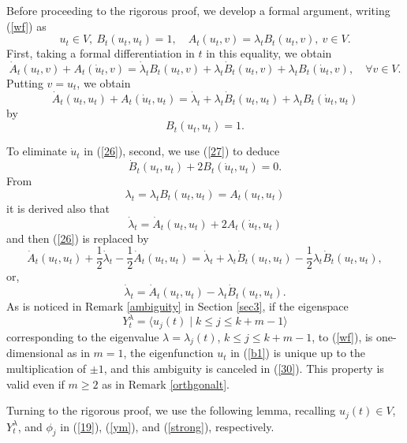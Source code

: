 \documentclass[final,a4paper]{jmsj}
\theoremstyle{thmstyleone}%
\theoremstyle{thmstyletwo}%
\theoremstyle{thmstylethree}%
\begin{document}
Before proceeding to the rigorous proof, we develop a formal argument, writing (\ref{wf}) as 
\begin{equation} 
u_t\in V, \ B_t(u_t,u_t)=1, \quad A_t(u_t,v)=\lambda_tB_t(u_t,v), \ v\in V.  
 \label{b1}
\end{equation} 
First, taking a formal differentiation in $t$ in this equality, we obtain   
\begin{equation} 
\dot A_t(u_t, v)+A_t(\dot u_t, v)=\dot \lambda_tB_t(u_t, v)+\lambda_t\dot B_t(u_t, v) + \lambda_tB_t(\dot u_t, v), \quad \forall v\in V. 
 \label{25} 
\end{equation} 
Putting $v=u_t$, we obtain 
\begin{equation} 
\dot A_t(u_t,u_t)+A_t(\dot u_t, u_t)=\dot\lambda_t+\lambda_t\dot B_t(u_t, u_t)+\lambda_tB_t(\dot u_t, u_t)   
 \label{26}
\end{equation} 
by 
\begin{equation} 
B_t(u_t,u_t)=1. 
 \label{27}
\end{equation} 

To eliminate $\dot u_t$ in (\ref{26}), second,  we use (\ref{27}) to deduce 
\begin{equation} 
\dot B_t(u_t,u_t)+2B_t(\dot u_t, u_t)=0. 
 \label{28}
\end{equation} 
From 
\[ \lambda_t=\lambda_tB_t(u_t,u_t)=A_t(u_t, u_t) \] 
it is derived also that 
\begin{equation} 
\dot \lambda_t=\dot A_t(u_t,u_t)+2A_t(\dot u_t, u_t) 
 \label{29}
\end{equation} 
and then (\ref{26}) is replaced by 
\[ \dot A_t(u_t,u_t)+\frac{1}{2}\dot\lambda_t-\frac{1}{2}\dot A_t(u_t, u_t)=\dot \lambda_t+\lambda_t\dot B_t(u_t, u_t)-\frac{1}{2}\lambda_t\dot B_t(u_t,u_t), \]  
or, 
\begin{equation} 
\dot \lambda_t=\dot A_t(u_t, u_t)-\lambda_t\dot B_t(u_t, u_t). 
 \label{30}
\end{equation} 
As is noticed in Remark \ref{ambiguity} in Section \ref{sec3}, if the eigenspace 
\[ Y_t^\lambda=\langle u_j(t) \mid k\leq j\leq k+m-1\rangle \] 
corresponding to the eigenvalue $\lambda=\lambda_j(t)$, $k\leq j\leq k+m-1$, to (\ref{wf}),  is one-dimensional as in $m=1$, the eigenfunction $u_t$ in (\ref{b1}) is unique up to the multiplication of $\pm 1$, and this ambiguity is canceled in (\ref{30}). This property is valid even if $m\geq 2$ as in Remark \ref{orthgonalt}. 

Turning to the rigorous proof, we use the following lemma, recalling $u_j(t)\in V$, $Y^\lambda_t$, and $\phi_j$ in (\ref{19}), (\ref{ym}), and (\ref{strong}), respectively. 
\end{document}
